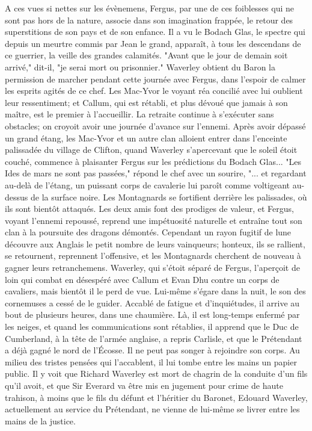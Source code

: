A ces vues si nettes sur les évènemens, Fergus, par une de ces foiblesses qui ne sont pas hors de la nature, associe dans son imagination frappée, le retour des superstitions de son pays et de son enfance. Il a vu le Bodach Glas, le spectre qui depuis un meurtre commis par Jean le grand, apparaît, à tous les descendans de ce guerrier, la veille des grandes calamités. "Avant que le jour de demain soit arrivé," dit-il, "je serai mort ou prisonnier."
Waverley obtient du Baron la permission de marcher pendant cette journée avec Fergus, dans l'espoir de calmer les esprits agités de ce chef. Les Mac-Yvor le voyant réa\setcounter{page}{367} concilié avec lui oublient leur ressentiment; et Callum, qui est rétabli, et plus dévoué que jamais à son maître, est le premier à l’accueillir. La retraite continue à s’exécuter sans obstacles; on croyoit avoir une journée d’avance sur l’ennemi. Après avoir dépassé un grand étang, les Mac-Yvor et un autre clan alloient entrer dans l’enceinte palissadée du village de Clifton, quand Waverley s’apercevant que le soleil étoit couché, commence à plaisanter Fergus sur les prédictions du Bodach Glas... "Les Ides de mars ne sont pas passées," répond le chef avec un sourire, "... et regardant au-delà de l’étang, un puissant corps de cavalerie lui paroît comme voltigeant au-dessus de la surface noire.
Les Montagnards se fortifient derrière les palissades, où ils sont bientôt attaqués. Les deux amis font des prodiges de valeur, et Fergus, voyant l’ennemi repoussé, reprend une impétuosité naturelle et entraîne tout son clan à la poursuite des dragons démontés. Cependant un rayon fugitif de lune découvre aux Anglais le petit nombre de leurs vainqueurs; honteux, ils se rallient, se retournent, reprennent l’offensive, et les Montagnards cherchent de nouveau à gagner leurs retranchemens. Waverley, qui s’étoit séparé de Fergus, l’aperçoit de loin qui combat en\setcounter{page}{368} désespéré avec Callum et Evan Dhu contre un corps de cavaliers, mais bientôt il le perd de vue. Lui-même s'égare dans la nuit, le son des cornemuses a cessé de le guider. Accablé de fatigue et d'inquiétudes, il arrive au bout de plusieurs heures, dans une chaumière. Là, il est long-temps enfermé par les neiges, et quand les communications sont rétablies, il apprend que le Duc de Cumberland, à la tête de l'armée anglaise, a repris Carlisle, et que le Prétendant a déjà gagné le nord de l'Écosse. Il ne peut pas songer à rejoindre son corps. Au milieu des tristes pensées qui l'accablent, il lui tombe entre les mains un papier public. Il y voit que Richard Waverley est mort de chagrin de la conduite d'un fils qu'il avoit, et que Sir Everard va être mis en jugement pour crime de haute trahison, à moins que le fils du défunt et l'héritier du Baronet, Edouard Waverley, actuellement au service du Prétendant, ne vienne de lui-même se livrer entre les mains de la justice.
